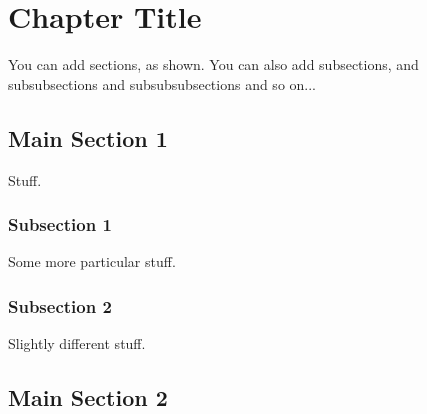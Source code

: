 
\chapter{Chapter Title} 

\label{ChapterX} 


You can add sections, as shown. You can also add subsections, and subsubsections and subsubsubsections and so on...

\section{Main Section 1}

Stuff. 

\subsection{Subsection 1}

Some more particular stuff.

\subsection{Subsection 2}

Slightly different stuff.

\section{Main Section 2}

